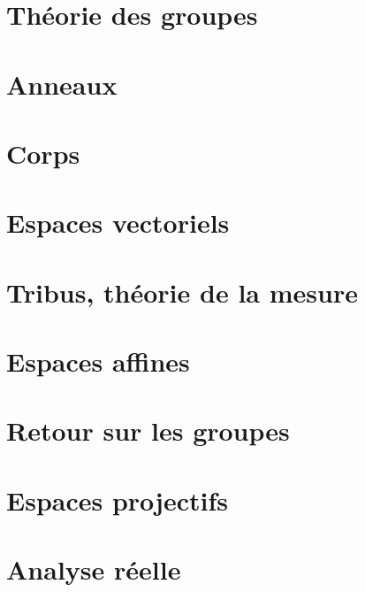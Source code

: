 \chapter{Théorie des groupes}



\chapter{Anneaux}


\chapter{Corps}






\chapter{Espaces vectoriels}







%
\chapter{Tribus, théorie de la mesure}





\chapter{Espaces affines}


\chapter{Retour sur les groupes}




\chapter{Espaces projectifs}


\chapter{Analyse réelle}







